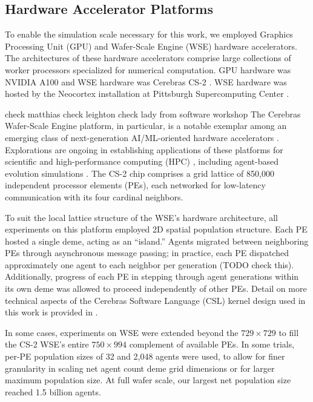 \subsection{Hardware Accelerator Platforms} \label{sec:hardware}

To enable the simulation scale necessary for this work, we employed Graphics Processing Unit (GPU) and Wafer-Scale Engine (WSE) hardware accelerators.
The architectures of these hardware accelerators comprise large collections of worker processors specialized for numerical computation.
GPU hardware was NVIDIA A100 and WSE hardware was Cerebras CS-2 \citep{choquette2021nvidia,cerebras2021wafer}.
WSE hardware was hosted by the Neocortex installation at Pittsburgh Supercomputing Center \citep{buitrago2021neocortex}.

check matthias
check leighton
check lady from software workshop
The Cerebras Wafer-Scale Engine platform, in particular, is a notable exemplar among an emerging class of next-generation AI/ML-oriented hardware accelerators \citep{lauterbach2021path}.
Explorations are ongoing in establishing applications of these platforms for scientific and high-performance computing (HPC) \citep{rocki2020fast,brown2023exploring,ltaief2023scaling,sai2023massively,brown2022distributed,luow2020using,woo2022distributed,tramm2024efficient,chen2024using,phillips2023solving,chen2024solving}, including agent-based evolution simulations \citep{moreno2024trackable}.
The CS-2 chip comprises a grid lattice of 850,000 independent processor elements (PEs), each networked for low-latency communication with its four cardinal neighbors.

To suit the local lattice structure of the WSE's hardware architecture, all experiments on this platform employed 2D spatial population structure.
Each PE hosted a single deme, acting as an ``island.''
Agents migrated between neighboring PEs through asynchronous message passing;
in practice, each PE dispatched approximately one agent to each neighbor per generation (TODO check this).
Additionally, progress of each PE in stepping through agent generations within its own deme was allowed to proceed independently of other PEs.
Detail on more technical aspects of the Cerebras Software Language (CSL) kernel design used in this work is provided in \citet{moreno2024trackable}.

In some cases, experiments on WSE were extended beyond the $729 \times 729$ to fill the CS-2 WSE's entire $750 \times 994$ complement of available PEs.
In some trials, per-PE population sizes of 32 and 2,048 agents were used, to allow for finer granularity in scaling net agent count deme grid dimensions or for larger maximum population size.
At full wafer scale, our largest net population size reached 1.5 billion agents.


